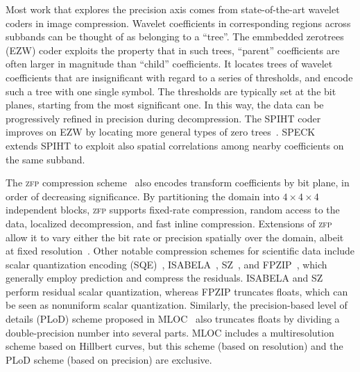 Most work that explores the precision axis comes from state-of-the-art wavelet coders in image
compression. Wavelet coefficients in corresponding regions across subbands can be thought of as
belonging to a ``tree''. The emmbedded zerotrees (EZW) coder exploits the property that in such
trees, ``parent'' coefficients are often larger in magnitude than ``child'' coefficients. It locates
trees of wavelet coefficients that are insignificant with regard to a series of thresholds, and
encode such a tree with one single symbol. The thresholds are typically set at the bit planes,
starting from the most significant one. In this way, the data can be progressively refined in
precision during decompression. The SPIHT coder~\cite{spiht1996} improves on EZW by locating more
general types of zero trees~\cite{quantifying-coding-performance}. SPECK~\cite{speck2004} extends
SPIHT to exploit also spatial correlations among nearby coefficients on the same subband.

\newcommand{\zfp}{\textsc{zfp}\xspace}
The \zfp compression scheme~\cite{zfp2014} also encodes transform coefficients by bit plane, in
order of decreasing significance. By partitioning the domain into $4 \times 4 \times 4$ independent
blocks, \zfp supports fixed-rate compression, random access to the data, localized decompression,
and fast inline compression. Extensions of \zfp allow it to vary either the bit rate or precision
spatially over the domain, albeit at fixed resolution~\cite{zfp-arc}. Other notable compression
schemes for scientific data include scalar quantization encoding (SQE)~\cite{sqe},
ISABELA~\cite{isabela}, SZ~\cite{sz}, and FPZIP~\cite{fpzip}, which generally employ prediction and
compress the residuals. ISABELA and SZ perform residual scalar quantization, whereas FPZIP truncates
floats, which can be seen as nonuniform scalar quantization. Similarly, the precision-based level of
details (PLoD) scheme proposed in MLOC~\cite{mloc} also truncates floats by dividing a
double-precision number into several parts. MLOC includes a multiresolution scheme based on Hillbert
curves, but this scheme (based on resolution) and the PLoD scheme (based on precision) are
exclusive.

